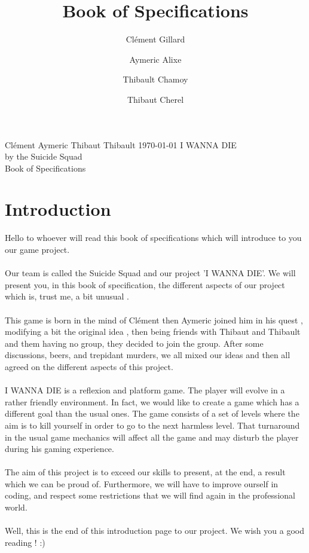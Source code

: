 \documentclass[twoside,12pt]{report}	%
\title{Book of Specifications}
\author{Clément Gillard
	\and Aymeric Alixe
	\and Thibault Chamoy
	\and Thibaut Cherel}
\begin{document}

	\begin{titlepage}
		Clément  Aymeric  Thibaut  Thibault  \hfill \today
		{\centering
			\vfill%
			\Huge I WANNA DIE
			\\[1cm]
			\small by the \Large Suicide Squad
			\\[1cm]
			\large Book of Specifications
			\vfill
		}
	\end{titlepage}

	\restoregeometry

	\newpage

	\tableofcontents

	\newpage
	\phantom{}
	\newpage
	\setcounter{page}{4}
	\chapter*{Introduction}

		Hello to whoever will read this book of specifications which will introduce to you our game project.
		\\\\
		Our team is called the Suicide Squad and our project 'I WANNA DIE'.
		We will present you, in this book of specification, the different aspects of our project which is, trust me, a bit unusual .
		\\\\
		This game is born in the mind of Clément then Aymeric joined him in his quest , modifying a bit the original idea , then being friends with Thibaut and Thibault and them having no group, they decided to join the group. After some discussions, beers, and trepidant murders, we all mixed our ideas and then all agreed on the different aspects of this project.
		\\\\
		I WANNA DIE is a reflexion and platform game. The player will evolve in a rather friendly environment.
		In fact, we would like to create a game which has a different goal than the usual ones. The game consists of a set of levels where the aim is to kill yourself in order to go to the next harmless level. That turnaround in the usual game mechanics will affect all the game and may disturb the player during his gaming experience.
		\\\\
		The aim of this project is to exceed our skills to present, at the end, a result which we can be proud of. Furthermore,
		we will have to improve ourself in coding, and respect some restrictions that we will find again in the professional world.
		\\\\
		Well, this is the end of this introduction page to our project. We wish you a good reading ! :)
		
\end{document}
